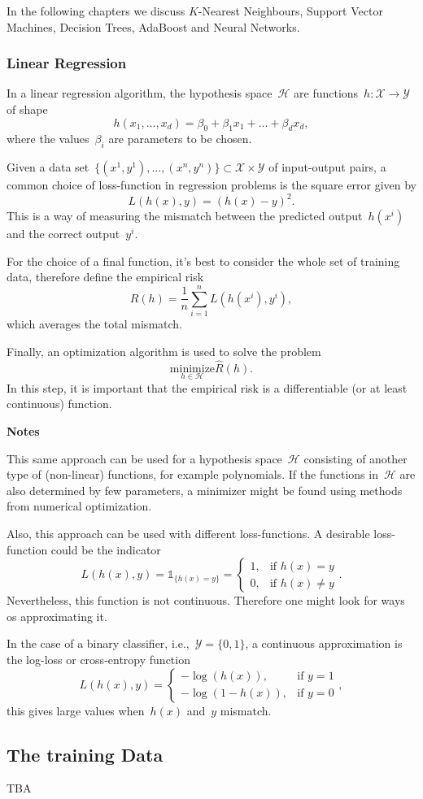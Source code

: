 In the following chapters we discuss $K$-Nearest Neighbours, Support Vector Machines,  Decision Trees, AdaBoost and Neural Networks.

\subsubsection{Linear Regression}
In a linear regression algorithm, the hypothesis space~$\mathcal{H}$ are functions~$h: \mathcal{X} \rightarrow \mathcal{Y}$ of shape
\[
h(x_1, \dots, x_d) = \beta_0 + \beta_1x_1 + \dots + \beta_dx_d,
\]
where the values~$\beta_i$ are parameters to be chosen. 

Given a data set~$\{(x^1, y^1), \dots, (x^n, y^n)\} \subset \mathcal{X} \times \mathcal{Y}$ of input-output pairs, a common choice of loss-function in regression problems is the square error given by
\[
L(h(x), y) = (h(x) - y)^2.
\]
This is a way of measuring the mismatch between the predicted output~$h(x^i)$ and the correct output~$y^i$.

For the choice of a final function, it's best to consider the whole set of training data, therefore define the empirical risk
\[
\hat{R}(h) = \frac{1}{n} \sum_{i = 1}^{n} L(h(x^i), y^i),
\]  
which averages the total mismatch. 

Finally, an optimization algorithm is used to solve the problem
\[
\underset{h \in \mathcal{H}}{\text{minimize}} \hat{R}(h).
\]
In this step, it is important that the empirical risk is a differentiable (or at least continuous) function.

\textbf{Notes}

This same approach can be used for a hypothesis space~$\mathcal{H}$ consisting of another type of (non-linear) functions, for example polynomials. If the functions in~$\mathcal{H}$ are also determined by few parameters, a minimizer might be found using methods from numerical optimization.

Also, this approach can be used with different loss-functions. A desirable loss-function could be the indicator
\[
L(h(x), y) = \mathds{1}_{\{h(x) = y\}} = \left\{ \begin{array}{lr}
1, & \text{if } h(x) = y\\
0, & \text{if } h(x)\neq y
\end{array} \right. .
\]
Nevertheless, this function is not continuous. Therefore one might look for ways os approximating it. 

In the case of a binary classifier, i.e.,~$\mathcal{Y} = \{0, 1\}$, a continuous approximation is the log-loss or cross-entropy function
\[
L(h(x), y) = \left\{ 
\begin{array}{lr}
-\log (h(x)), & \text{if } y = 1\\
-\log (1 - h(x)), & \text{if } y = 0
\end{array} \right. ,
\]
this gives large values when~$h(x)$ and~$y$ mismatch.





\subsection{The training Data}
TBA





\newpage